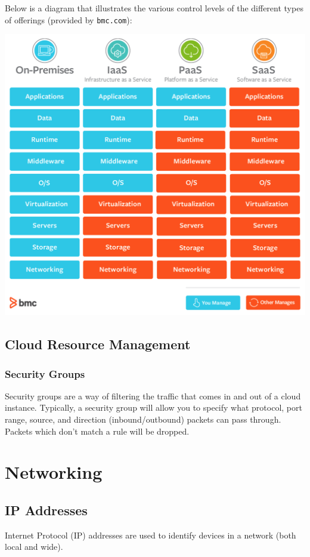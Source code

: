 \documentclass{report}
\newcommand{\npar}{\par\noindent}
\begin{document}
\npar Below is a diagram that illustrates the various control levels of the different types of offerings (provided by \verb|bmc.com|):
\begin{center}
    \includegraphics[scale=0.65]{1-4-2.png}
\end{center}

%
%
\section{Cloud Resource Management}

\subsection{Security Groups}

\par Security groups are a way of filtering the traffic that comes in and out of a cloud instance. Typically, a security group will allow you to specify what protocol, port range, source, and direction (inbound/outbound) packets can pass through. Packets which don't match a rule will be dropped.

\chapter{Networking}

\section{IP Addresses}
\par Internet Protocol (IP) addresses are used to identify devices in a network (both local and wide).
\end{document}
